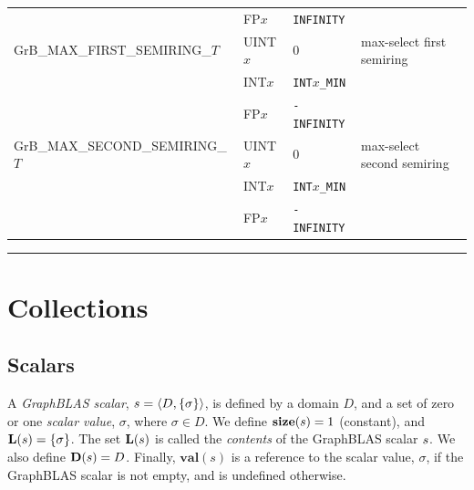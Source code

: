 \begin{table}
\begin{threeparttable}
\begin{tabular}{l|l|l|l}
                                    & {\sf FP$x$}              & {\tt INFINITY}    &                 \\
{\sf GrB\_MAX\_FIRST\_SEMIRING\_$T$}  & {\sf UINT$x$}            & 0                 & max-select first  semiring     \\
                                    & {\sf INT$x$}             & {\tt INT$x$\_MIN} &                 \\
                                    & {\sf FP$x$}              & {\tt -INFINITY}   &                 \\
{\sf GrB\_MAX\_SECOND\_SEMIRING\_$T$} & {\sf UINT$x$}            & 0                 & max-select second semiring     \\
                                    & {\sf INT$x$}             & {\tt INT$x$\_MIN} &                 \\
                                    & {\sf FP$x$}              & {\tt -INFINITY}   &                 \\
\end{tabular}

\hrule
{}
\end{threeparttable}
\end{table}

\section{Collections}

\subsection{Scalars}
\label{Sec:Scalars}

A \emph{GraphBLAS scalar}, ${s} = \langle D, \{ \sigma \} \rangle$, is defined by
a domain $D$, and a set of zero or one \emph{scalar value}, $\sigma$, where $\sigma \in D$. 
We define $\mathbf{size}({s}) = 1$ (constant), and
$\mathbf{L}({s}) = \{ \sigma \}$. The set $\mathbf{L}({s})$ is
called the \emph{contents} of the GraphBLAS scalar ${s}$. We also define 
$\mathbf{D}({s}) = D$. Finally, $\mathbf{val}(s)$ is a 
reference to the scalar value, $\sigma$, if the GraphBLAS scalar is not empty, and is 
undefined otherwise.


